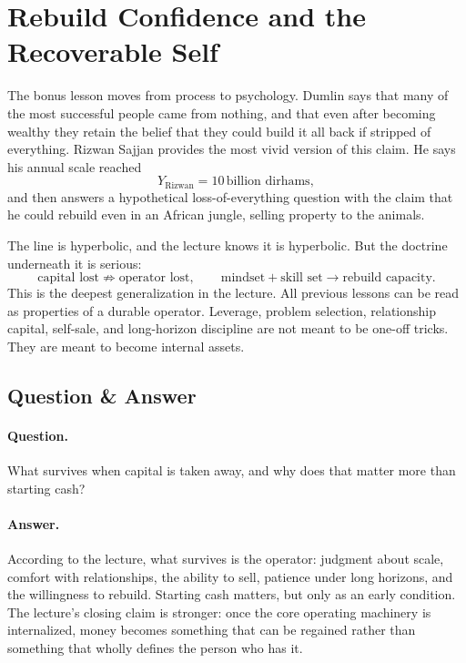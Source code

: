 \section{Rebuild Confidence and the Recoverable Self}

The bonus lesson moves from process to psychology. Dumlin says that many of the most successful people came from nothing, and that even after becoming wealthy they retain the belief that they could build it all back if stripped of everything. Rizwan Sajjan provides the most vivid version of this claim. He says his annual scale reached
\begin{equation}
Y_{\text{Rizwan}} = 10\,\text{billion dirhams},
\end{equation}
and then answers a hypothetical loss-of-everything question with the claim that he could rebuild even in an African jungle, selling property to the animals.

The line is hyperbolic, and the lecture knows it is hyperbolic. But the doctrine underneath it is serious:
\begin{equation}
\text{capital lost} \not\Rightarrow \text{operator lost},
\qquad
\text{mindset} + \text{skill set} \to \text{rebuild capacity}.
\end{equation}
This is the deepest generalization in the lecture. All previous lessons can be read as properties of a durable operator. Leverage, problem selection, relationship capital, self-sale, and long-horizon discipline are not meant to be one-off tricks. They are meant to become internal assets.

\subsection{Question \& Answer}

\paragraph{Question.} What survives when capital is taken away, and why does that matter more than starting cash?

\paragraph{Answer.} According to the lecture, what survives is the operator: judgment about scale, comfort with relationships, the ability to sell, patience under long horizons, and the willingness to rebuild. Starting cash matters, but only as an early condition. The lecture's closing claim is stronger: once the core operating machinery is internalized, money becomes something that can be regained rather than something that wholly defines the person who has it.

